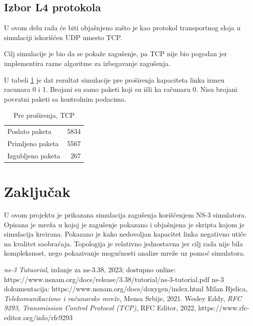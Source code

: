 \documentclass[a4paper, 12pt, projekat]{etf}
\begin{document}
	\section{Izbor L4 protokola}
	U ovom delu rada \'ce biti obja\v{s}njeno za\v{s}to je kao protokol transportnog sloja u simulaciji iskori\v{s}\'cen UDP umesto TCP.
	
	Cilj simulacije je bio da se poka\v{z}e zagu\v{s}enje, pa TCP nije bio pogodan jer implementira razne algoritme za izbegavanje zagu\v{s}enja. \cite{tcp} 
	
	U tabeli \ref{tab:tcp} je dat rezultat simulacije pre pro\v{s}irenja kapaciteta linka izme\dj{}u racunara 0 i 1. Brojani su samo paketi koji su i\v{s}li ka ra\v{c}unaru 0. Nisu brojani povratni paketi sa kontrolnim podacima.
	
	\begin{table}[htb]
		\centering
		\caption{Pre pro\v{s}irenja, TCP}
		\label{tab:tcp}
		\medskip
		\begin{tabular}{l|r}
			\hline
			Poslato paketa & 5834 \\
			Primljeno paketa & 5567 \\
			Izgubljeno paketa & 267 
		\end{tabular}
	\end{table}
	\chapter{Zaključak}
	U ovom projektu je prikazana simulacija zagušenja korišćenjem NS-3 simulatora. Opisana je mreža u kojoj je zagušenje pokazano i objašnjena je skripta  kojom je simulacija kreirana. Pokazano je kako nedovoljan kapacitet linka negativno utiče na kvalitet saobraćaja. Topologija je relativno jednostavna jer cilj rada nije bila kompleksnost, nego pokazivanje mogućnosti analize mreže uz pomoć simulatora. 
	\begin{thebibliography}{10}
		 \emph{ns-3 Tutuorial}, izdanje za ns-3.38, 2023; dostupno online:
		https://www.nsnam.org/docs/release/3.38/tutorial/ns-3-tutorial.pdf
		 ns-3 dokumentacija: https://www.nsnam.org/docs/doxygen/index.html
		 Milan Bjelica, \emph{Telekomunikacione i ra\v{c}unarske mre\v{z}e}, Mensa Srbije, 2021. 
		 Wesley Eddy, \emph{RFC 9293, Transmission Control Protocol (TCP)}, RFC Editor, 2022, https://www.rfc-editor.org/info/rfc9293
 	\end{thebibliography}
 	
\end{document}

